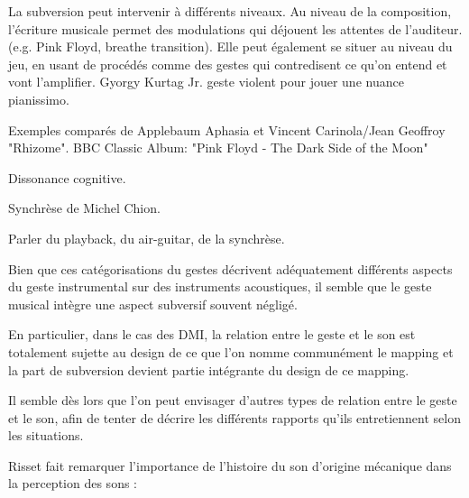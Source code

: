 La subversion peut intervenir à différents niveaux. Au niveau de la composition, l'écriture musicale permet des modulations qui déjouent les attentes de l'auditeur. (e.g. Pink Floyd, breathe transition). Elle peut également se situer au niveau du jeu, en usant de procédés comme des gestes qui contredisent ce qu'on entend et vont l'amplifier. Gyorgy Kurtag Jr. geste violent pour jouer une nuance pianissimo.

Exemples comparés de Applebaum Aphasia et Vincent Carinola/Jean Geoffroy "Rhizome".
BBC Classic Album: "Pink Floyd - The Dark Side of the Moon"

Dissonance cognitive.

Synchrèse de Michel Chion.

Parler du playback, du air-guitar, de la synchrèse.

Bien que ces catégorisations du gestes décrivent adéquatement différents aspects du geste instrumental sur des instruments acoustiques, il semble que le geste musical intègre une aspect subversif souvent négligé.

En particulier, dans le cas des \gls{DMI}, la relation entre le geste et le son est totalement sujette au design de ce que l'on nomme communément le \gls{mapping} et la part de subversion devient partie intégrante du design de ce mapping. 


Il semble dès lors que l'on peut envisager d'autres types de relation entre le geste et le son, afin de tenter de décrire les différents rapports qu'ils entretiennent selon les situations.

Risset fait remarquer l'importance de l'histoire du son d'origine mécanique dans la perception des sons \cite{risset_son_1992}: 

